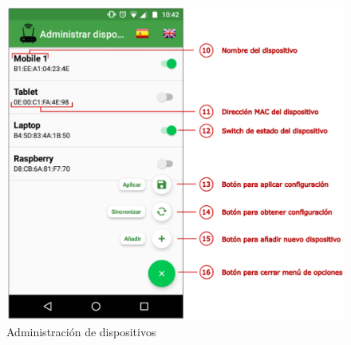\documentclass[12pt]{article}
\begin{document}
        \begin{figure}[h!]
            \centering
                \includegraphics[scale=0.5]{devices_activity_manual.eps}
                \caption*{Administración de dispositivos}
                \label{fig:devices_activity_manual}
        \end{figure}
\end{document}

